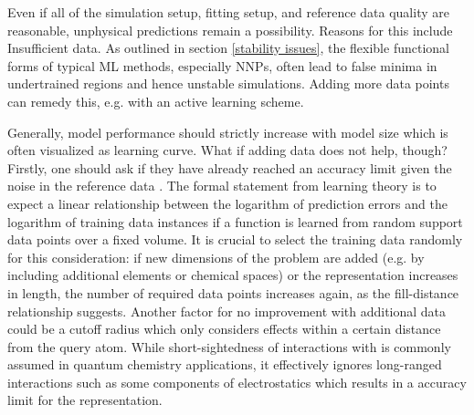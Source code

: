 \documentclass[9pt,bestpractices]{livecoms}
\begin{document}
Even if all of the simulation setup, fitting setup, and reference data quality are reasonable, unphysical predictions remain a possibility. Reasons for this include
Insufficient data. As outlined in section \ref{stability issues}, the flexible functional forms of typical ML methods, especially NNPs, often lead to false minima in undertrained regions and hence unstable simulations. Adding more data points can remedy this, e.g. with an active learning scheme.

Generally, model performance should strictly increase with model size which is often visualized as learning curve\cite{Viering2023}. What if adding data does not help, though? Firstly, one should ask if they have already reached an accuracy limit given the noise in the reference data \cite{Christensen2020}. The formal statement from learning theory is to expect a linear relationship between the logarithm of prediction errors and the logarithm of training data instances if a function is learned from random support data points over a fixed volume\cite{NIPS1993_1aa48fc4}. It is crucial to select the training data randomly for this consideration: if new dimensions of the problem are added (e.g. by including additional elements or chemical spaces) or the representation increases in length, the number of required data points increases again, as the fill-distance relationship\cite{Madych1992} suggests. Another factor for no improvement with additional data could be a cutoff radius which only considers effects within a certain distance from the query atom. While short-sightedness of interactions with is commonly assumed in quantum chemistry applications\cite{Prodan2005}, it effectively ignores long-ranged interactions such as some components of electrostatics which results in a accuracy limit for the representation.

\end{document}
